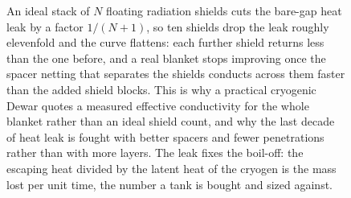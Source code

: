 \begin{figure}[htbp]
\centering
{}
\caption[Heat leak through a multilayer cryogenic blanket]{An ideal stack
of $N$ floating radiation shields cuts the bare-gap heat leak by a factor
$1/(N+1)$, so ten shields drop the leak roughly elevenfold and the curve
flattens: each further shield returns less than the one before, and a real
blanket stops improving once the spacer netting that separates the shields
conducts across them faster than the added shield blocks. This is why a
practical cryogenic Dewar quotes a measured effective conductivity for the
whole blanket rather than an ideal shield count, and why the last decade of
heat leak is fought with better spacers and fewer penetrations rather than
with more layers. The leak fixes the boil-off: the escaping heat divided by
the latent heat of the cryogen is the mass lost per unit time, the number a
tank is bought and sized against.}
\label{fig:vol04ch05:cryostat-boiloff}
\end{figure}
